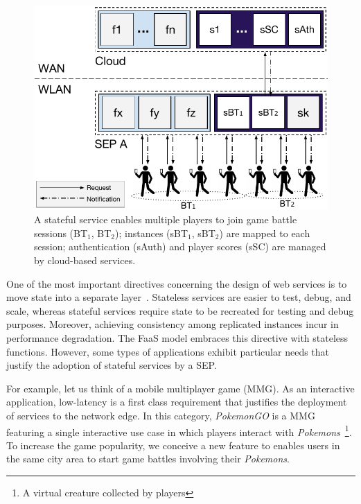 \begin{figure}[tbp]
	\centering
	\includegraphics[width=\linewidth]{Figs/Stateful_Edge_Services.pdf}
	\caption{A stateful service enables multiple players to join game battle sessions (BT$_1$, BT$_2$); instances (sBT$_1$, sBT$_2$) are mapped to each session; authentication (sAuth) and player scores (sSC) are managed by cloud-based services.}
	\label{fig:Steteful_Edge_MMG}
\end{figure}

One of the most important directives concerning the design of web services is to move state into a separate layer~\cite{Armbrust:2010}. Stateless services are easier to test, debug, and scale, whereas stateful services require state to be recreated for testing and debug purposes. Moreover, achieving consistency among replicated instances incur in performance degradation. The FaaS model embraces this directive with stateless functions.
However, some types of applications exhibit particular needs that justify the adoption of stateful services by a SEP.

For example, let us think of a mobile multiplayer game (MMG). As an interactive application, low-latency is a first class requirement that justifies the deployment of services to the network edge. In this category, \textit{PokemonGO} is 
a MMG featuring a single interactive use case in which players interact with \textit{Pokemons}~\footnote{A virtual creature collected by players}.
To increase the game popularity, we conceive a new feature to enables users in the same city area to start game battles involving their \textit{Pokemons}. 

